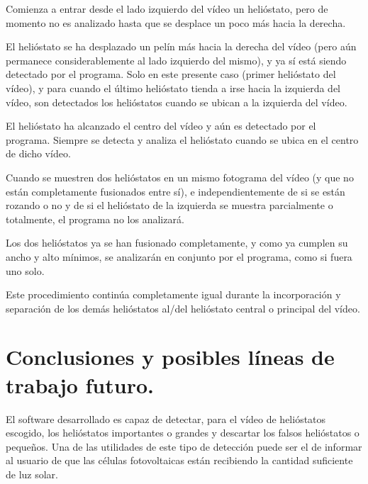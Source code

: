 \documentclass[12pt]{article}
\begin{document}
Comienza a entrar desde el lado izquierdo del vídeo un helióstato, pero de momento no es analizado hasta que se desplace un poco más hacia la derecha.




El helióstato se ha desplazado un pelín más hacia la derecha del vídeo (pero aún permanece considerablemente al lado izquierdo del mismo), y ya sí está siendo detectado por el programa. Solo en este presente caso (primer helióstato del vídeo), y para cuando el último helióstato tienda a irse hacia la izquierda del vídeo, son detectados los helióstatos cuando se ubican a la izquierda del vídeo.




El helióstato ha alcanzado el centro del vídeo y aún es detectado por el programa. Siempre se detecta y analiza el helióstato cuando se ubica en el centro de dicho vídeo.





Cuando se muestren dos helióstatos en un mismo fotograma del vídeo (y que no están completamente fusionados entre sí), e independientemente de si se están rozando o no y de si el helióstato de la izquierda se muestra parcialmente o totalmente, el programa no los analizará.




Los dos helióstatos ya se han fusionado completamente, y como ya cumplen su ancho y alto mínimos, se analizarán en conjunto por el programa, como si fuera uno solo.

Este procedimiento continúa completamente igual durante la incorporación y separación de los demás helióstatos al/del helióstato central o principal del vídeo.


\section{Conclusiones y posibles líneas de trabajo futuro.}
 
El software desarrollado es capaz de detectar, para el vídeo de helióstatos escogido, los helióstatos importantes o grandes y descartar los falsos helióstatos o pequeños. Una de las utilidades de este tipo de detección puede ser el de informar al usuario de que las células fotovoltaicas están recibiendo la cantidad suficiente de luz solar.
 
\end{document}
